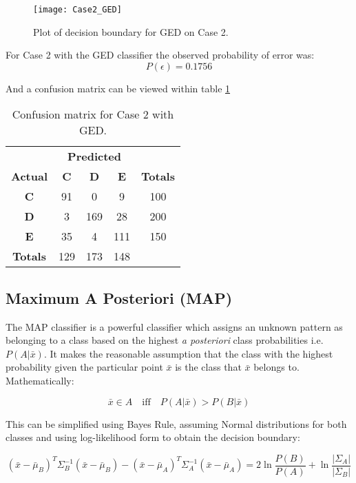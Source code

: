 \documentclass{article}
\begin{document}
\begin{figure}[H]
    \caption{Plot of decision boundary for GED on Case 2.}
    \centering
    \texttt{[image: Case2\_GED]}
    \label{fig:Case2_GED}
\end{figure}

For Case 2 with the GED classifier the observed probability of error was:
\[P(\epsilon) = 0.1756\]

And a confusion matrix can be viewed within table \ref{tab:Case2_GED_error}

\begin{table}[H]
    \centering
    \begin{tabular}{c|c c c|c|}
        & \multicolumn{3}{c|}{\textbf{Predicted}} \\
        \textbf{Actual} & \textbf{C} & \textbf{D} & \textbf{E} & \textbf{Totals} \\
        \hline
        \textbf{C} & 91 \cellcolor[gray]{.8} & 0 & 9 & 100 \\
        \textbf{D} & 3 & 169 \cellcolor[gray]{.8} & 28 & 200\\
        \textbf{E} & 35 & 4 & 111 \cellcolor[gray]{.8} & 150\\\hline
        \textbf{Totals} & 129 & 173 & 148\\
        \cline{1-4}

    \end{tabular}
    \caption{Confusion matrix for Case 2 with GED.}
    \label{tab:Case2_GED_error}
\end{table}

\subsection{Maximum A Posteriori (MAP)}
The MAP classifier is a powerful classifier which assigns an unknown pattern as belonging to a class based on the highest \textit{a posteriori} class probabilities i.e. $P(A|\bar{x})$. It makes the reasonable assumption that the class with the highest probability given the particular point $\bar{x}$ is the class that $\bar{x}$ belongs to. Mathematically:

$$
\bar{x} \in A \quad \text{iff} \quad P(A|\bar{x}) > P(B|\bar{x})
$$

This can be simplified using Bayes Rule, assuming Normal distributions for both classes and using log-likelihood form to obtain the decision boundary:

$$
(\bar{x}-\bar{\mu}_B)^T \Sigma_B^{-1} (\bar{x}-\bar{\mu}_B) - (\bar{x} -\bar{\mu}_A)^T \Sigma_A^{-1} (\bar{x}-\bar{\mu}_A) = 2\ln{\frac{P(B)}{P(A)}}+\ln{\frac{|\Sigma_A|}{|\Sigma_B|}}
$$
\end{document}
